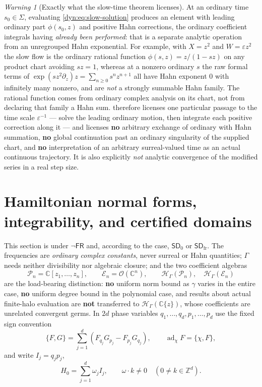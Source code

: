 \documentclass[11pt,letterpaper]{article}
\theoremstyle{definition}
\theoremstyle{remark}
\newtheorem{warning}[warning]{Warning}
\newcommand{\C}{\mathbb C}
\newcommand{\Z}{\mathbb Z}
\newcommand{\HH}{\mathscr H}
\newcommand{\OO}{\mathcal O}
\newcommand{\EE}{\mathscr E}
\newcommand{\PP}{\mathscr P}
\newcommand{\ad}{\operatorname{ad}}
\newcommand{\eps}{\varepsilon}
\newcommand{\sdz}{\mathsf{SD}_{0}}
\newcommand{\sdfr}{\mathsf{SD}_{\mathrm{fr}}}
\newcommand{\fres}{\mathsf{FR}}
\numberwithin{equation}{section}
\begin{document}
\begin{warning}[Exactly what the slow-time theorem licenses]
\label{dyn:warn:slowtime}
At an ordinary time $s_0\in\Sigma$, evaluating
\eqref{dyn:eq:slow-solution} produces an element with leading ordinary part
$\phi(s_0,z)$ and positive Hahn corrections, the ordinary coefficient
integrals having \emph{already been performed}: that is a separate analytic
operation from an unregrouped Hahn exponential. For example, with $X=z^{2}$
and $W=\eps z^{2}$ the slow flow is the ordinary rational function
$\phi(s,z)=z/(1-sz)$ on any product chart avoiding $sz=1$, whereas at a
nonzero ordinary $s$ the raw formal terms of
$\exp(sz^{2}\partial_z)z=\sum_{n\ge0}s^{n}z^{n+1}$ all have Hahn exponent
$0$ with infinitely many nonzero, and are \emph{not} a strongly summable
Hahn family. The rational function comes from ordinary complex analysis on
its chart, not from declaring that family a Hahn sum.
 therefore licenses one particular passage to the
time scale $\eps^{-1}$ --- solve the leading ordinary motion, then
integrate each positive correction along it --- and licenses \textbf{no}
arbitrary exchange of ordinary with Hahn summation, \textbf{no} global
continuation past an ordinary singularity of the supplied chart, and
\textbf{no} interpretation of an arbitrary surreal-valued time as an actual
continuous trajectory. It is also explicitly \emph{not} analytic
convergence of the modified series in a real step size.
\end{warning}

\section{Hamiltonian normal forms, integrability, and certified domains}
\label{dyn:sec:hamiltonian}

This section is under $\lnot\fres$ and, according to the case,
$\sdz$ or $\sdfr$. The frequencies are \emph{ordinary complex constants},
never surreal or Hahn quantities; $\Gamma$ needs neither divisibility nor
algebraic closure; and the two coefficient algebras
\begin{equation}\label{dyn:eq:coeffalgebra}
 \PP_n=\C[z_1,\dots,z_n],\qquad \EE_n=\OO(\C^{n}),\qquad
 \HH_\Gamma(\PP_n),\quad \HH_\Gamma(\EE_n)
\end{equation}
are the load-bearing distinction: \textbf{no} uniform norm bound as
$\gamma$ varies in the entire case, \textbf{no} uniform degree bound in the
polynomial case, and results about actual finite-halo evaluation are
\textbf{not} transferred to $\HH_\Gamma(\C\{z\})$, whose coefficients are
unrelated convergent germs. In $2d$ phase variables
$q_1,\dots,q_d,p_1,\dots,p_d$ use the fixed sign convention
\begin{equation}\label{dyn:eq:pb}
 \{F,G\}=\sum_{j=1}^{d}(F_{q_j}G_{p_j}-F_{p_j}G_{q_j}),
 \qquad \ad_\chi F=\{\chi,F\},
\end{equation}
and write $I_j=q_jp_j$,
\begin{equation}\label{dyn:eq:H0intro}
 H_0=\sum_{j=1}^{d}\omega_jI_j,\qquad
 \omega\cdot k\ne0\quad(0\ne k\in\Z^{d}).
\end{equation}
\end{document}
